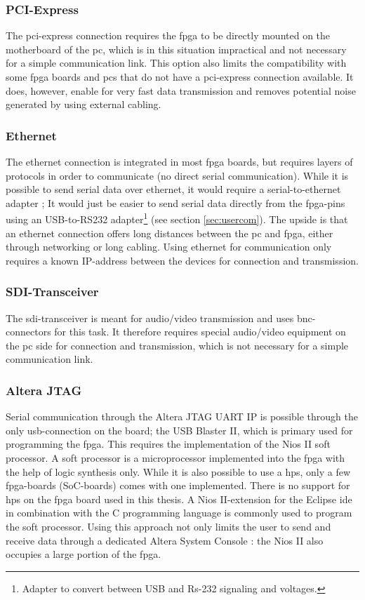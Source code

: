 \documentclass[main.tex]{subfiles}
\begin{document}
\subsubsection{PCI-Express}
The \gls{pci}-express connection requires the \gls{fpga} to be directly mounted on the motherboard of the \acrshort{pc}, which is in this situation impractical and not necessary for a simple communication link. This option also limits the compatibility with some \gls{fpga} boards and \acrshort{pc}s that do not have a \gls{pci}-express connection available. It does, however, enable for very fast data transmission and removes potential noise generated by using external cabling. 

\subsubsection{Ethernet}
The ethernet connection is integrated in most \gls{fpga} boards, but requires layers of protocols in order to communicate (no direct serial communication). While it is possible to send serial data over ethernet, it would require a serial-to-ethernet adapter \cite{serial2ethernet}; It would just be easier to send serial data directly from the \gls{fpga}-pins using an USB-to-RS232 adapter\footnote{Adapter to convert between USB and Rs-232 signaling and voltages.} (see section \ref{sec:usercom}). The upside is that an ethernet connection offers long distances between the \acrshort{pc} and \gls{fpga}, either through networking or long cabling. Using ethernet for communication only requires a known IP-address between the devices for connection and transmission.

\subsubsection{SDI-Transceiver}
The \acrshort{sdi}-transceiver is meant for audio/video transmission and uses \acrshort{bnc}-connectors for this task. It therefore requires special audio/video equipment on the \acrshort{pc} side for connection and transmission, which is not necessary for a simple communication link.

\subsubsection{Altera JTAG}
Serial communication through the Altera JTAG UART IP is possible through the only \acrshort{usb}-connection on the board; the USB Blaster II, which is primary used for programming the \gls{fpga}. This requires the implementation of the Nios II soft processor. A soft processor is a microprocessor implemented into the \gls{fpga} with the help of logic synthesis only. While it is also possible to use a \gls{hps}, only a few \gls{fpga}-boards (SoC-boards) comes with one implemented. There is no support for \gls{hps} on the \gls{fpga} board used in this thesis. A Nios II-extension for the Eclipse \acrshort{ide} in combination with the C programming language is commonly used to program the soft processor. Using this approach not only limits the user to send and receive data through a dedicated Altera System Console \cite{altera_terminals14}: the Nios II also occupies a large portion of the \gls{fpga}.
\end{document}
